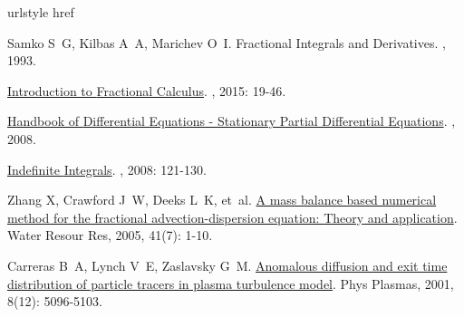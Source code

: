 \begin{thebibliography}{79}
    \providecommand{\natexlab}[1]{#1}
    \providecommand{\url}[1]{#1}
    \expandafter\ifx\csname urlstyle\endcsname\relax\else
      \fi
    \expandafter\ifx\csname href\endcsname\relax
      \DeclareUrlCommand{}
      \def\eprint#1#2{#2}
    \else
      \def\doi#1{\href{https://doi.org/#1}{\nolinkurl{#1}}}
      \let\eprint\href
    \fi
    
    Samko S~G, Kilbas A~A, Marichev O~I.
    \newblock Fractional Integrals and Derivatives\allowbreak[M].
    , 1993.
    
    \href{https://www.taylorfrancis.com/books/9781482253818/chapters/10.1201/b18503-6}{Introduction to {{Fractional Calculus}}}\allowbreak[M].
    , 2015: 19-46.
    
    \href{https://linkinghub.elsevier.com/retrieve/pii/S1874573308X80167}{Handbook of {{Differential Equations}} - {{Stationary Partial Differential Equations}}}\allowbreak[M].
    , 2008.
    
    \href{https://www.taylorfrancis.com/books/9781584889571/chapters/10.1201/9781584889571-7}{Indefinite {{Integrals}}}\allowbreak[M].
    , 2008: 121-130.
    
    Zhang X, Crawford J~W, Deeks L~K, et~al.
    \newblock \href{http://doi.wiley.com/10.1029/2004WR003818}{A mass balance based numerical method for the fractional advection-dispersion equation: {{Theory}} and application}\allowbreak[J].
    \newblock Water Resour Res, 2005, 41\allowbreak (7): 1-10.
    
    Carreras B~A, Lynch V~E, Zaslavsky G~M.
    \newblock \href{http://aip.scitation.org/doi/10.1063/1.1416180}{Anomalous diffusion and exit time distribution of particle tracers in plasma turbulence model}\allowbreak[J].
    \newblock Phys Plasmas, 2001, 8\allowbreak (12): 5096-5103.
    

\end{thebibliography}
